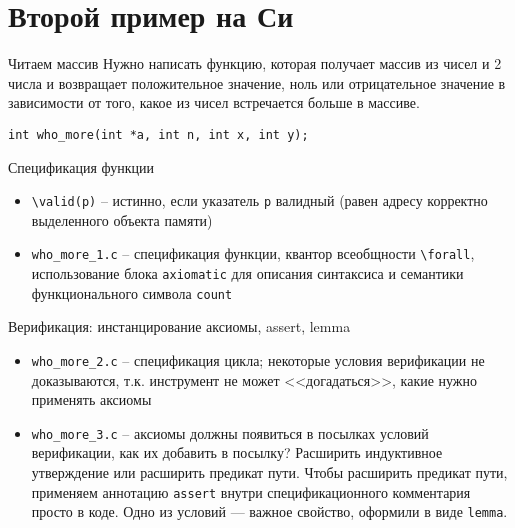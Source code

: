 \documentclass[hyperref={unicode=true}]{beamer}
\begin{document}
    \section{Второй пример на Си}
    \begin{frame}{Читаем массив}
    Нужно написать функцию, которая получает массив из чисел и 2 числа и возвращает положительное значение, ноль или отрицательное значение в зависимости от того, какое из чисел встречается больше в массиве.

    \texttt{int who\_more(int *a, int n, int x, int y);}
    \end{frame}

    \begin{frame}{Спецификация функции}
    \begin{itemize}
    \item \texttt{\textbackslash valid(p)} -- истинно, если указатель \texttt{p} валидный (равен адресу корректно выделенного объекта памяти)
    \item \texttt{who\_more\_1.c} -- спецификация функции, квантор всеобщности \texttt{\textbackslash forall}, использование блока \texttt{axiomatic} для описания синтаксиса и семантики функционального символа \texttt{count}
    \end{itemize}
    \end{frame}

    \begin{frame}{Верификация: инстанцирование аксиомы, assert, lemma}
    \begin{itemize}
    \item \texttt{who\_more\_2.c} -- спецификация цикла; некоторые условия верификации не доказываются, т.к. инструмент не может <<догадаться>>, какие нужно применять аксиомы
    \item \texttt{who\_more\_3.c} -- аксиомы должны появиться в посылках условий верификации, как их добавить в посылку? Расширить индуктивное утверждение или расширить предикат пути. Чтобы расширить предикат пути, применяем аннотацию \texttt{assert} внутри спецификационного комментария просто в коде. Одно из условий --- важное свойство, оформили в виде \texttt{lemma}.
    \end{itemize}
    \end{frame}
\end{document}

